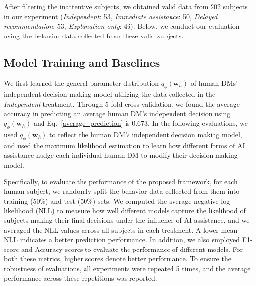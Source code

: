 \documentclass[letterpaper]{article} %
\newcommand{\my}[1]{\textcolor{blue}{[Ming: #1]}}
\newcommand{\zy}[1]{\textcolor{red}{[Zhuoyan: #1]}}
\begin{document}
After filtering the inattentive subjects, we obtained valid data from 202 subjects in our experiment (\emph{Independent}: 53, \emph{Immediate assistance}: 50, \emph{Delayed recommendation}: 53, \emph{Explanation only}: 46). Below, we conduct our evaluation using the behavior data collected from these valid subjects.
\subsection{Model Training and Baselines}
We first learned the general parameter distribution $q_{\phi}(\bm{w}_h)$ of human DMs' independent decision making model
utilizing the data collected in the \emph{Independent} treatment. Through 5-fold cross-validation, we found the average accuracy in predicting an average human DM's independent decision
using $q_{\phi}(\bm{w}_h)$ and Eq.~\ref{average_prediction}  is $0.673$. In the following evaluations, we used $q_{\phi}(\bm{w}_h)$ to reflect the human DM's independent decision making model, and used the maximum likelihood estimation to learn how different forms of AI assistance nudge each individual human DM to modify their decision making model.


Specifically, to evaluate the performance of the proposed framework, for each human subject, we randomly split the behavior data collected from them into training
(50\%) and test (50\%) sets. We computed the average negative log-likelihood (NLL) to measure how well different models capture the likelihood of subjects making their final decisions under the influence of AI assistance,
and we averaged the NLL values across all subjects in each treatment. A lower mean NLL indicates a better prediction performance. In addition, we also employed F1-score and Accuracy scores to evaluate the performance of different models. For both these metrics, higher scores denote better performance. To ensure the robustness of evaluations, all experiments were repeated 5 times, and the average performance across these repetitions was reported.
\end{document}
